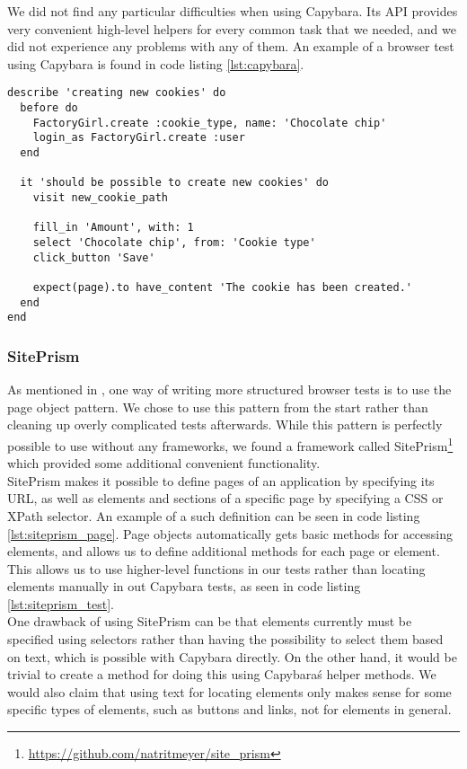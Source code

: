 We did not find any particular difficulties when using Capybara. Its API
provides very convenient high-level helpers for every common task that
we needed, and we did not experience any problems with any of them. An
example of a browser test using Capybara is found in code listing
\ref{lst:capybara}.\\


\begin{lstlisting}[caption=A browser test written in RSpec using Capybara.,
                   label=lst:capybara, float=t]
describe 'creating new cookies' do
  before do
    FactoryGirl.create :cookie_type, name: 'Chocolate chip'
    login_as FactoryGirl.create :user
  end

  it 'should be possible to create new cookies' do
    visit new_cookie_path

    fill_in 'Amount', with: 1
    select 'Chocolate chip', from: 'Cookie type'
    click_button 'Save'

    expect(page).to have_content 'The cookie has been created.'
  end
end
\end{lstlisting}


\subsubsection{SitePrism}

As mentioned in , one way of writing more
structured browser tests is to use the page object pattern. We chose to
use this pattern from the start rather than cleaning up overly
complicated tests afterwards. While this pattern is perfectly possible
to use without any frameworks, we found a framework called
SitePrism\footnote{\url{https://github.com/natritmeyer/site_prism}}
which provided some additional convenient functionality.\\

SitePrism makes it possible to define pages of an application by
specifying its URL, as well as elements and sections of a specific page
by specifying a CSS or XPath selector. An example of a such definition
can be seen in code listing \ref{lst:siteprism_page}. Page objects
automatically gets basic methods for accessing elements, and allows us
to define additional methods for each page or element. This allows us to
use higher-level functions in our tests rather than locating elements
manually in out Capybara tests, as seen in code listing
\ref{lst:siteprism_test}.\\

One drawback of using SitePrism can be that elements currently must be
specified using selectors rather than having the possibility to select
them based on text, which is possible with Capybara directly. On the
other hand, it would be trivial to create a method for doing this using
Capybara\'s helper methods. We would also claim that using text
for locating elements only makes sense for some specific types of
elements, such as buttons and links, not for elements in general.\\

